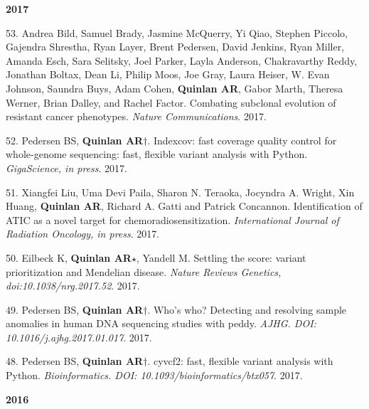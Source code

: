 \documentclass[margin,line]{cv}
\begin{document}
\begin{resume}
\begin{list}{*}{}
    \end{list}
 

    \textbf{2017} \\

    \begin{list}{*}{}

    \item[53.] Andrea Bild, Samuel Brady, Jasmine McQuerry, Yi Qiao, Stephen Piccolo, Gajendra Shrestha, Ryan Layer, Brent Pedersen, David Jenkins, Ryan Miller, Amanda Esch, Sara Selitsky, Joel Parker, Layla Anderson, Chakravarthy Reddy, Jonathan Boltax, Dean Li, Philip Moos, Joe Gray, Laura Heiser, W. Evan Johnson, Saundra Buys, Adam Cohen,  \textbf{Quinlan AR}, Gabor Marth, Theresa Werner, Brian Dalley, and Rachel Factor.
    Combating subclonal evolution of resistant cancer phenotypes. \emph{Nature Communications}. 2017.

    \item[52.] Pedersen BS, \textbf{Quinlan AR}$\dagger$.
    Indexcov: fast coverage quality control for whole-genome sequencing: fast, flexible variant analysis with Python. \emph{GigaScience, in press}. 2017. 

    \item[51.] Xiangfei Liu, Uma Devi Paila, Sharon N. Teraoka, Jocyndra A. Wright, Xin Huang, \textbf{Quinlan AR}, Richard A. Gatti and Patrick Concannon.
    Identification of ATIC as a novel target for chemoradiosensitization. \emph{International Journal of Radiation Oncology, in press}. 2017.

    \item[50.] Eilbeck K, \textbf{Quinlan AR}$\star$, Yandell M.
    Settling the score: variant prioritization and Mendelian disease. \emph{Nature Reviews Genetics, doi:10.1038/nrg.2017.52}. 2017.

    \item[49.] Pedersen BS, \textbf{Quinlan AR}$\dagger$.
    Who's who? Detecting and resolving sample anomalies in human DNA  sequencing studies with ​peddy. \emph{AJHG. DOI: 10.1016/j.ajhg.2017.01.017}. 2017. 

    \item[48.] Pedersen BS, \textbf{Quinlan AR}$\dagger$.
    cyvcf2: fast, flexible variant analysis with Python. \emph{Bioinformatics. DOI: 10.1093/bioinformatics/btx057}. 2017. 

    \end{list}


    \textbf{2016} \\


\end{resume}
\end{document}

